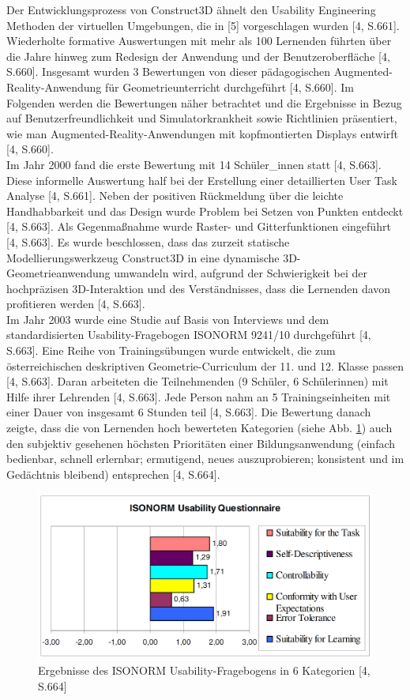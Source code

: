 \documentclass[deutsch]{llncs}
\begin{document}
Der Entwicklungsprozess von Construct3D ähnelt den Usability Engineering Methoden der virtuellen Umgebungen, die in [5] vorgeschlagen wurden [4, S.661]. Wiederholte formative Auswertungen mit mehr als 100 Lernenden führten über die Jahre hinweg zum Redesign der Anwendung und der Benutzeroberfläche [4, S.660]. Insgesamt wurden 3 Bewertungen von dieser pädagogischen Augmented-Reality-Anwendung für Geometrieunterricht durchgeführt [4, S.660]. Im Folgenden werden die Bewertungen näher betrachtet und die Ergebnisse in Bezug auf Benutzerfreundlichkeit und Simulatorkrankheit sowie Richtlinien präsentiert, wie man Augmented-Reality-Anwendungen mit kopfmontierten Displays entwirft [4, S.660].\\
Im Jahr 2000 fand die erste Bewertung mit 14 Schüler\_innen statt [4, S.663]. Diese informelle Auswertung half bei der Erstellung einer detaillierten User Task Analyse [4, S.661]. Neben der positiven Rückmeldung über die leichte Handhabbarkeit und das Design wurde Problem bei Setzen von Punkten entdeckt [4, S.663]. Als Gegenmaßnahme wurde Raster- und Gitterfunktionen eingeführt [4, S.663]. Es wurde beschlossen, dass das zurzeit statische Modellierungswerkzeug Construct3D in eine dynamische 3D-Geometrieanwendung umwandeln wird, aufgrund der Schwierigkeit bei der hochpräzisen 3D-Interaktion und des Verständnisses, dass die Lernenden davon profitieren werden [4, S.663]. \\
Im Jahr 2003 wurde eine Studie auf Basis von Interviews und dem standardisierten Usability-Fragebogen ISONORM 9241/10 durchgeführt [4, S.663]. Eine Reihe von Trainingsübungen wurde entwickelt, die zum österreichischen deskriptiven Geometrie-Curriculum der 11. und 12. Klasse passen [4, S.663].  Daran arbeiteten die Teilnehmenden (9 Schüler, 6 Schülerinnen) mit Hilfe ihrer Lehrenden [4, S.663]. Jede Person nahm an 5 Trainingseinheiten mit einer Dauer von insgesamt 6 Stunden teil [4, S.663]. Die Bewertung danach zeigte, dass die von Lernenden hoch bewerteten Kategorien (siehe Abb. \ref{Fragebogen}) auch den subjektiv gesehenen höchsten Prioritäten einer Bildungsanwendung (einfach bedienbar, schnell erlernbar; ermutigend, neues auszuprobieren; konsistent und im Gedächtnis bleibend) entsprechen [4, S.664].\\
\begin{figure}
\begin{center}
\includegraphics[scale=0.2]{Bilder/Fragebogen.PNG}
\caption{Ergebnisse des ISONORM Usability-Fragebogens in 6 Kategorien [4, S.664]}
\label{Fragebogen}
\end{center}
\end{figure}
\end{document}
